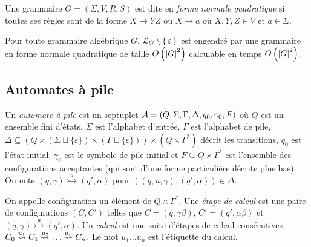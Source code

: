 \documentclass[../../agregation.tex]{subfiles}
\begin{document}
\begin{defn}
	Une grammaire $G=(\Sigma,V,R,S)$ est dite en \emph{forme normale quadratique} si toutes ses règles sont de la forme $X\to YZ$ ou $X\to a$ où $X,Y,Z\in V$ et $a\in\Sigma$.
\end{defn}

\begin{prop}
	Pour toute grammaire algébrique $G$, $\mathcal{L}_{G}\setminus\set{\varepsilon}$ est engendré par une grammaire
	en forme normale quadratique de taille $O\left(\left|G\right|^{2}\right)$
	calculable en temps $O\left(\left|G\right|^{2}\right)$.
\end{prop}


\subsection{Automates à pile} %

\begin{defn}
	Un \emph{automate à pile} est un septuplet $\mathcal{A}=(Q,\Sigma, \Gamma, \Delta, q_0, \gamma_0, F)$ où $Q$ est un ensemble fini d'états, $\Sigma$ est l'alphabet d'entrée, $\Gamma$ est l'alphabet de pile, $\Delta\subseteq\left(Q\times (\Sigma\sqcup \{\varepsilon\})\times (\Gamma \sqcup \{\varepsilon\})\right)\times\left( Q\times \Gamma^*\right)$ décrit les transitions, $q_0$ est l'état initial, $\gamma_0$ est le symbole de pile initial et $F\subseteq Q\times\Gamma^*$ est l'ensemble des configurations acceptantes (qui sont d'une forme particulière décrite plus bas). On note $(q, \gamma)\overset{u}{\rightarrowtail} (q', \alpha)$ pour $((q,u,\gamma),(q',\alpha))\in \Delta$.
\end{defn}

\begin{defn}
	On appelle configuration un élément de $Q\times\Gamma^*$. Une \emph{étape de calcul} est une paire de configurations $(C,C')$ telles que $C=(q,\gamma\beta)$, $C'=(q',\alpha\beta)$ et $(q, \gamma)\overset{u}{\rightarrowtail} (q', \alpha)$. Un \emph{calcul} est une suite d'étapes de calcul consécutives $C_0\transitionn{u_1}{}C_1\transitionn{u_2}{}\dots \transitionn{u_n}{}C_n$. Le mot $u_1\dots u_n$ est l'étiquette du calcul.
\end{defn}
\end{document}
